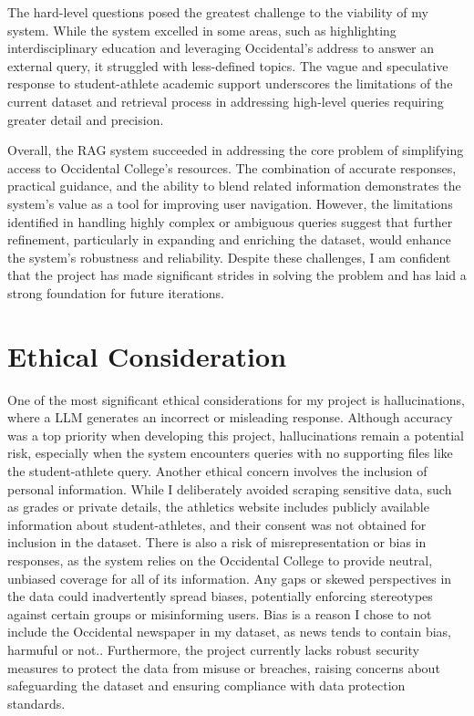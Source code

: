 \documentclass[10pt,twocolumn]{article}
\begin{document}
\indent The hard-level questions posed the greatest challenge to the viability of my system. While the system excelled in some areas, such as highlighting interdisciplinary education and leveraging Occidental’s address to answer an external query, it struggled with less-defined topics. The vague and speculative response to student-athlete academic support underscores the limitations of the current dataset and retrieval process in addressing high-level queries requiring greater detail and precision.

\indent Overall, the RAG system succeeded in addressing the core problem of simplifying access to Occidental College’s resources. The combination of accurate responses, practical guidance, and the ability to blend related information demonstrates the system’s value as a tool for improving user navigation. However, the limitations identified in handling highly complex or ambiguous queries suggest that further refinement, particularly in expanding and enriching the dataset, would enhance the system’s robustness and reliability. Despite these challenges, I am confident that the project has made significant strides in solving the problem and has laid a strong foundation for future iterations.

\section{Ethical Consideration}
One of the most significant ethical considerations for my project is hallucinations, where a LLM generates an incorrect or misleading response\cite{lakera_hallucinations_llms}. Although accuracy was a top priority when developing this project, hallucinations remain a potential risk, especially when the system encounters queries with no supporting files like the student-athlete query. Another ethical concern involves the inclusion of personal information\cite{roy2024protecting}. While I deliberately avoided scraping sensitive data, such as grades or private details, the athletics website includes publicly available information about student-athletes, and their consent was not obtained for inclusion in the dataset. There is also a  risk of misrepresentation or bias in responses, as the system relies on the Occidental College to provide neutral, unbiased coverage for all of its information\cite{orange_llm_bias}. Any gaps or skewed perspectives in the data could inadvertently spread biases, potentially enforcing stereotypes against certain groups or misinforming users. Bias is a reason I chose to not include the Occidental newspaper in my dataset, as news tends to contain bias, harmuful or not.\cite{lwv_media_bias}. Furthermore, the project currently lacks robust security measures to protect the data from misuse or breaches, raising concerns about safeguarding the dataset and ensuring compliance with data protection standards\cite{kumar2024ethicsinteractionmitigatingsecurity}.
\end{document}
